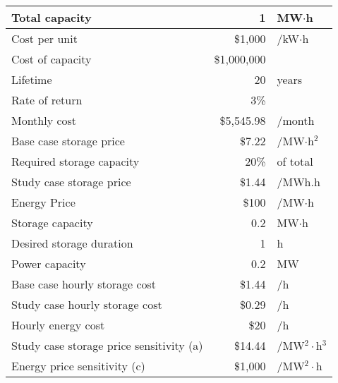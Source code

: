\begin{tabular}{|l|rl|}
\hline
Total capacity & 1 & MW$\cdot$h\\ \hline
Cost per unit & \$1,000 & /kW$\cdot$h\\ \hline
Cost of capacity & \$1,000,000 & \\ \hline
Lifetime & 20 & years\\ \hline
Rate of return & 3\% & \\ \hline
Monthly cost & \$5,545.98 & /month\\ \hline
Base case storage price & \$7.22 & /MW$\cdot$h$^2$\\ \hline
Required storage capacity & 20\% & of total\\ \hline
Study case storage price & \$1.44 & /MWh.h\\ \hline
Energy Price & \$100 & /MW$\cdot$h\\ \hline
Storage capacity & 0.2 & MW$\cdot$h\\ \hline
Desired storage duration & 1 & h\\ \hline
Power capacity & 0.2 & MW\\ \hline
Base case hourly storage cost & \$1.44 & /h\\ \hline
Study case hourly storage cost & \$0.29 & /h\\ \hline
Hourly energy cost & \$20 & /h\\ \hline
Study case storage price sensitivity (a) & \$14.44 & /MW$^2\cdot$h$^3$\\ \hline
Energy price sensitivity (c) & \$1,000 & /MW$^2\cdot$h\\ \hline
\end{tabular}
